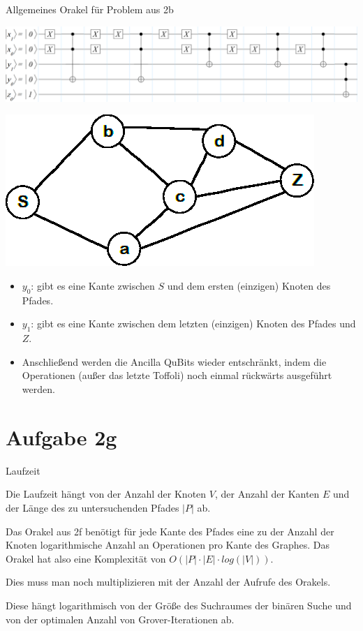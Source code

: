 \documentclass[fleqn,compress,utf8,aspectratio=169,t]{beamer}
\begin{document}
\begin{frame}{Allgemeines Orakel für Problem aus 2b}
\begin{minipage}{.75\textwidth}
	\includegraphics[width=.95\textwidth]{images/2f.png}
\end{minipage}%
\begin{minipage}{.25\textwidth}
	\includegraphics[width=.95\textwidth]{images/2-graph.png}
\end{minipage}
\begin{itemize}
	\item $y_0$: gibt es eine Kante zwischen $S$ und dem ersten (einzigen) Knoten des Pfades.
	\item $y_1$: gibt es eine Kante zwischen dem letzten (einzigen) Knoten des Pfades und $Z$.
	\item Anschließend werden die Ancilla QuBits wieder entschränkt, indem die Operationen (außer das letzte Toffoli) noch einmal rückwärts ausgeführt werden.
\end{itemize}
\end{frame}

\section{Aufgabe 2g}

\begin{frame}{Laufzeit}

Die Laufzeit hängt von der Anzahl der Knoten $V$, der Anzahl der Kanten $E$ und der Länge des zu untersuchenden Pfades $|P|$ ab.

Das Orakel aus 2f benötigt für jede Kante des Pfades eine zu der Anzahl der Knoten logarithmische Anzahl an Operationen pro Kante des Graphes. Das Orakel hat also eine Komplexität von $O(|P| \cdot |E| \cdot log(|V|))$.

Dies muss man noch multiplizieren mit der Anzahl der Aufrufe des Orakels.

Diese hängt logarithmisch von der Größe des Suchraumes der binären Suche und von der optimalen Anzahl von Grover-Iterationen ab.
\end{frame}
\end{document}
